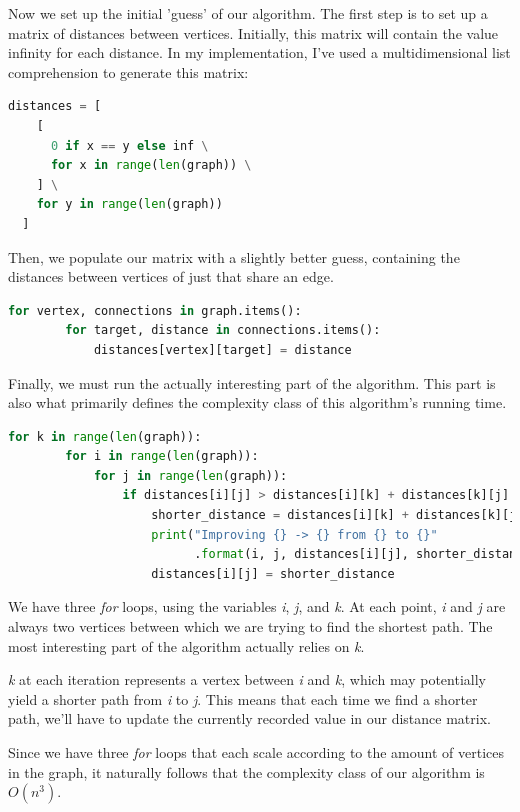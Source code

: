 \documentclass{article}
\begin{document}
Now we set up the initial 'guess' of our algorithm.
The first step is to set up a matrix of distances between vertices.
Initially, this matrix will contain the value infinity for each distance.
In my implementation, I've used a multidimensional list comprehension to generate this matrix:

\begin{lstlisting}[language=Python]
  distances = [
    [
      0 if x == y else inf \
      for x in range(len(graph)) \
    ] \
    for y in range(len(graph))
  ]
\end{lstlisting}

Then, we populate our matrix with a slightly better guess, containing the distances between vertices of just that share an edge.

\begin{lstlisting}[language=Python]
    for vertex, connections in graph.items():
        for target, distance in connections.items():
            distances[vertex][target] = distance
\end{lstlisting}

Finally, we must run the actually interesting part of the algorithm.
This part is also what primarily defines the complexity class of this algorithm's running time.

\begin{lstlisting}[language=Python]
  for k in range(len(graph)):
        for i in range(len(graph)):
            for j in range(len(graph)):
                if distances[i][j] > distances[i][k] + distances[k][j]:
                    shorter_distance = distances[i][k] + distances[k][j]
                    print("Improving {} -> {} from {} to {}"
                          .format(i, j, distances[i][j], shorter_distance))
                    distances[i][j] = shorter_distance
\end{lstlisting}

We have three {\em for} loops, using the variables {\em i}, {\em j}, and {\em k}.
At each point, {\em i} and {\em j} are always two vertices between which we are trying to find the shortest path. The most interesting part of the algorithm actually relies on {\em k}.

{\em k} at each iteration represents a vertex between {\em i} and {\em k}, which may potentially yield a shorter path from {\em i} to {\em j}. This means that each time we find a shorter path, we'll have to update the currently recorded value in our distance matrix.

Since we have three {\em for} loops that each scale according to the amount of vertices in the graph,
it naturally follows that the complexity class of our algorithm is \(O(n^3)\).
\end{document}
